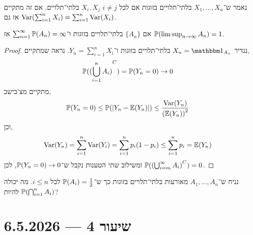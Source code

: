 נאמר ש־$X_1, \ldots, X_n$ בלתי־תלויים בזוגות אם לכל $i \ne j$ $X_i, X_j$ בלתי־תלויים.
אם זה מתקיים אז גם $\operatorname{Var}(\sum_{i = 1}^n X_i) = \sum_{i = 1}^n \operatorname{Var}(X_i)$.
\begin{lemma}
	אם ${\{ A_n \}}$ בלתי־תלויים בזוגות ו־$\sum_{n = 1}^\infty \mathbb{P}(A_n) = \infty$ אז $\mathbb{P}(\limsup_{n \to \infty} A_n) = 1$.
\end{lemma}
\begin{proof}
	נגדיר $X_n = \indicator_{A_n}$ בלתי־תלויים בזוגות ו־$Y_n = \sum_{i = 1}^n X_i$.
	נראה שמתקיים,
	\[
		\mathbb{P}({(\bigcup_{i = 1}^n A_i)}^C)
		= \mathbb{P}(Y_n = 0)
		\to 0
	\]
	מתקיים מצ'בישב,
	\[
		\mathbb{P}(Y_n = 0)
		\le \mathbb{P}(| Y_n - \mathbb{E}(Y_n) |)
		\le \frac{\operatorname{Var}(Y_n)}{{(\mathbb{E}(Y_n))}^2}
	\]
	וכן,
	\[
		\operatorname{Var}(Y_n)
		= \sum_{i = 1}^n \operatorname{Var}(Y_i)
		= \sum_{i = 1}^n p_i(1 - p_i)
		\le \sum_{i = 1}^n p_i
		= \mathbb{E}(Y_n)
	\]
	ומשילוב שתי הטענות נקבל ש־$\mathbb{P}(Y_n = 0) \to 0$, לכן $\mathbb{P}({(\bigcup_{i = m}^\infty A_i)}^C) = 0$.
\end{proof}
\begin{exercise}
	נניח ש־$A_1, \ldots, A_n$ מאורעות בלתי־תלויים בזוגות כך ש־$\mathbb{P}(A_i) = \frac{1}{2}$ לכל $i \le n$.
	מה יכולה להיות $\mathbb{P}(\bigcap_{i = 1}^n A_i)$?
\end{exercise}

\section{שיעור 4 --- 6.5.2026}
